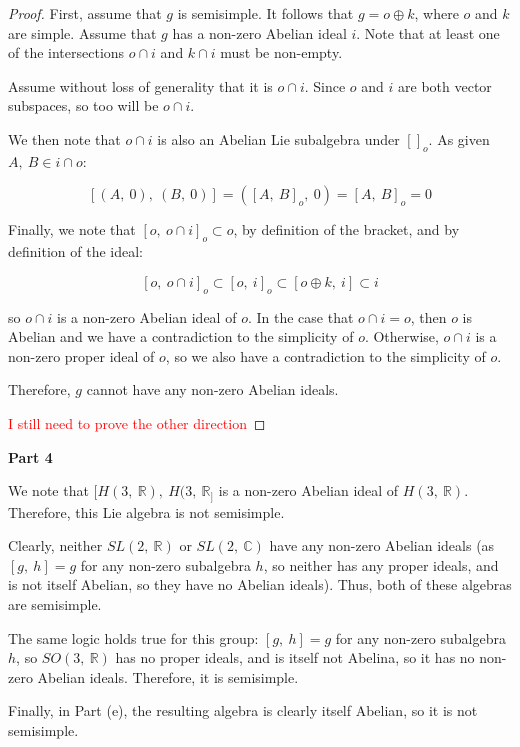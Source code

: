 \documentclass[10pt, oneside]{article}
\begin{document}
    \begin{proof}
      First, assume that $g$ is semisimple. It follows that $g = o \oplus k$, where $o$ and $k$ are simple. Assume that $g$ has a non-zero Abelian ideal $i$.
      Note that at least one of the intersections $o \cap i$ and $k \cap i$ must be non-empty.
      \newline

      Assume without loss of generality that it is $o \cap i$. Since $o$ and $i$ are both vector subspaces, so too will be $o \cap i$.
      \newline

      We then note that $o \cap i$ is also an Abelian Lie subalgebra under $[]_{o}$. As given $A, \ B \in i \cap o$:

      $$[(A, \ 0), \ (B, \ 0)] = ([A, \ B]_{o}, \ 0) = [A, \ B]_{o} = 0$$

      Finally, we note that $[o, \ o \cap i]_{o} \subset o$, by definition of the bracket, and by definition of the ideal:

      $$[o, \ o \cap i]_{o} \subset [o, \ i]_{o} \subset [o \oplus k, \ i] \subset i$$

      so $o \cap i$ is a non-zero Abelian ideal of $o$. In the case that $o \cap i = o$, then $o$ is Abelian and we have a contradiction to the simplicity
      of $o$. Otherwise, $o \cap i$ is a non-zero proper ideal of $o$, so we also have a contradiction to the simplicity of $o$.
      \newline

      Therefore, $g$ cannot have any non-zero Abelian ideals.
      \newline

      \textcolor{red}{I still need to prove the other direction}
    \end{proof}

    \textbf{Part 4}
    \newline

    We note that $[H(3, \ \mathbb{R}), \ H(3, \ \mathbb{R}_]$ is a non-zero Abelian ideal of $H(3, \ \mathbb{R})$. Therefore, this Lie algebra is not semisimple.
    \newline

    Clearly, neither $SL(2, \ \mathbb{R})$ or $SL(2, \ \mathbb{C})$ have any non-zero Abelian ideals (as $[g, \ h] = g$ for any non-zero subalgebra $h$, so neither has any proper ideals, and is not itself Abelian, so they have
    no Abelian ideals). Thus, both of
    these algebras are semisimple.
    \newline

    The same logic holds true for this group: $[g, \ h] = g$ for any non-zero subalgebra $h$, so $SO(3, \ \mathbb{R})$ has no proper ideals, and is itself not Abelina, so it has no
    non-zero Abelian ideals. Therefore, it is semisimple.
    \newline

    Finally, in Part (e), the resulting algebra is clearly itself Abelian, so it is not semisimple.

    
\end{document}
